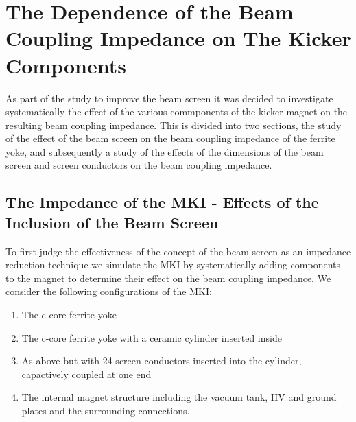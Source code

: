\section{The Dependence of the Beam Coupling Impedance on The Kicker Components}

As part of the study to improve the beam screen it was decided to investigate systematically the effect of the various commponents of the kicker magnet on the resulting beam coupling impedance. This is divided into two sections, the study of the effect of the beam screen on the beam coupling impedance of the ferrite yoke, and subsequently a study of the effects of the dimensions of the beam screen and screen conductors on the beam coupling impedance.

\subsection{The Impedance of the MKI - Effects of the Inclusion of the Beam Screen}

To first judge the effectiveness of the concept of the beam screen as an impedance reduction technique we simulate the MKI by systematically adding components to the magnet to determine their effect on the beam coupling impedance. We consider the following configurations of the MKI:

\begin{enumerate}
\item{The c-core ferrite yoke}
\item{The c-core ferrite yoke with a ceramic cylinder inserted inside}
\item{As above but with 24 screen conductors inserted into the cylinder, capactively coupled at one end}
\item{The internal magnet structure including the vacuum tank, HV and ground plates and the surrounding connections.}
\end{enumerate}

